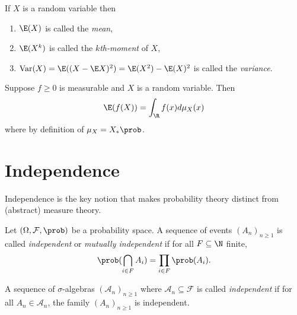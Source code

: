 \documentclass[a4paper]{article}
\renewcommand{\P}{\prob} %
\DeclareMathOperator{\var}{Var} %
\begin{document}
\begin{definition}
  If \(X\) is a random variable then
  \begin{enumerate}
  \item \(\E(X)\) is called the \emph{mean},
  \item \(\E(X^k)\) is called the \emph{\(k\)th-moment} of \(X\),
  \item \(\var(X) = \E((X - \E X)^2) = \E(X^2) - \E(X)^2\) is called the \emph{variance}.
  \end{enumerate}
\end{definition}

\begin{remark}
  Suppose \(f \geq 0\) is measurable and \(X\) is a random variable. Then
  \[
    \E(f(X)) = \int_\R f(x) d \mu_X(x)
  \]
  where by definition of \(\mu_X = X_* \P\).
\end{remark}

\section{Independence}

Independence is the key notion that makes probability theory distinct from (abstract) measure theory.

\begin{definition}[independence]
  Let \((\Omega, \mathcal F, \P)\) be a probability space. A sequence of events \((A_n)_{n \geq 1}\) is called \emph{independent} or \emph{mutually independent} if for all \(F \subseteq \N\) finite,
  \[
    \P(\bigcap_{i \in F} A_i) = \prod_{i \in F} \P(A_i).
  \]
\end{definition}

\begin{definition}
  A sequence of \(\sigma\)-algebras \((\mathcal A_n)_{n \geq 1}\) where \(\mathcal A_n \subseteq \mathcal F\) is called \emph{independent} if for all \(A_n \in \mathcal A_n\), the family \((A_n)_{n \geq 1}\) is independent.
\end{definition}
\end{document}
